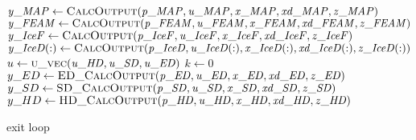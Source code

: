 \documentclass[10pt,letterpaper,oneside,notitlepage]{article}
\begin{document}
\begin{algorithmic}[1]

	\State
	\State $\mathit{y\_MAP}  \gets \Call{CalcOutput}{\mathit{p\_MAP},\mathit{u\_MAP},\mathit{x\_MAP},\mathit{xd\_MAP},\mathit{z\_MAP}}$ 
	\State $\mathit{y\_FEAM} \gets \Call{CalcOutput}{\mathit{p\_FEAM},\mathit{u\_FEAM},\mathit{x\_FEAM},\mathit{xd\_FEAM},\mathit{z\_FEAM}}$
	\State $\mathit{y\_IceF} \gets \Call{CalcOutput}{\mathit{p\_IceF},\mathit{u\_IceF},\mathit{x\_IceF},\mathit{xd\_IceF},\mathit{z\_IceF}}$
	\State $\mathit{y\_IceD(:)} \gets \Call{CalcOutput}{\mathit{p\_IceD},\mathit{u\_IceD(:)},\mathit{x\_IceD(:)},\mathit{xd\_IceD(:)},\mathit{z\_IceD(:)}}$
	\State
	\State{}
	\State
	\State $u \gets \Call{u\_vec}{\mathit{u\_HD},\mathit{u\_SD},\mathit{u\_ED}}$
	\State $k \gets 0$
	\Loop{}
		\State $y\_ED \gets \Call{ED\_CalcOutput}{\mathit{p\_ED},\mathit{u\_ED},\mathit{x\_ED},\mathit{xd\_ED},\mathit{z\_ED}}$
		\State $y\_SD \gets \Call{SD\_CalcOutput}{\mathit{p\_SD},\mathit{u\_SD},\mathit{x\_SD},\mathit{xd\_SD},\mathit{z\_SD}}$
		\State $y\_HD \gets \Call{HD\_CalcOutput}{\mathit{p\_HD},\mathit{u\_HD},\mathit{x\_HD},\mathit{xd\_HD},\mathit{z\_HD}}$
	
			\State exit loop
		\EndIf
		

\end{algorithmic}
\end{document}
